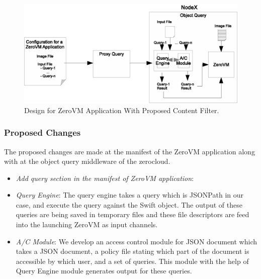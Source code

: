 \begin{appendices}
\begin{figure}[t]
\centering
\includegraphics {eps/proposed-zapp}
\caption{Design for ZeroVM Application With Proposed Content Filter.}
\label{fig:proposed-zapp}
\end{figure}

\subsubsection{Proposed Changes}
The proposed changes are made  at the manifest of the ZeroVM application along with at the object query middleware of the zerocloud.

\begin{itemize}

\item \emph{Add query section in the manifest of ZeroVM application}:  

\item \emph{Query Engine}: The query engine takes a query which is JSONPath in our case, and execute the query against the Swift object. The output of these queries are being saved in temporary files and these file descriptors are feed into the launching ZeroVM as input channels.

\item \emph{A/C Module}: We develop an  access control module for JSON document which takes a JSON document, a policy file stating which part of the document is accessible by which user, and a set of queries. This module with the help of Query Engine module generates output for these queries.

\end{itemize}

\end{appendices}
